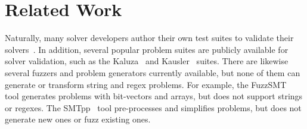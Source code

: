 \section{Related Work}

Naturally, many solver developers author their own test suites to
validate their solvers~\cite{cvc4-tests,z3str3-tests,z3str2-tests}. In
addition, several popular problem suites are publicly available for
solver validation, such as the Kaluza~\cite{kaluza} and
Kausler~\cite{kausler} suites. There are likewise several fuzzers and
problem generators currently available, but none of them can generate
or transform string and regex problems. For example, the
FuzzSMT~\cite{fuzzsmt} tool generates \smt{} problems with bit-vectors
and arrays, but does not support strings or regexes. The
SMTpp~\cite{smtpp} tool pre-processes and simplifies problems, but
does not generate new ones or fuzz existing ones.

